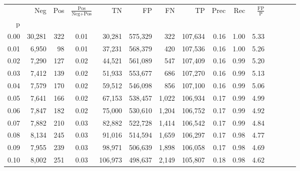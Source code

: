 \begin{tabular}{rrrcrrrrrrrrrrr}
\toprule
{} &     Neg &    Pos & $\frac{\text{Pos}}{\text{Neg}+\text{Pos}}$ &       TN &       FP &       FN &       TP &  Prec &   Rec & $\frac{\text{FP}}{\text{P}}$ \\
p    &         &        &                                            &          &          &          &          &       &       &                              \\
\midrule
0.00 &  30,281 &    322 &                                       0.01 &   30,281 &  575,329 &      322 &  107,634 &  0.16 &  1.00 &                         5.33 \\
0.01 &   6,950 &     98 &                                       0.01 &   37,231 &  568,379 &      420 &  107,536 &  0.16 &  1.00 &                         5.26 \\
0.02 &   7,290 &    127 &                                       0.02 &   44,521 &  561,089 &      547 &  107,409 &  0.16 &  0.99 &                         5.20 \\
0.03 &   7,412 &    139 &                                       0.02 &   51,933 &  553,677 &      686 &  107,270 &  0.16 &  0.99 &                         5.13 \\
0.04 &   7,579 &    170 &                                       0.02 &   59,512 &  546,098 &      856 &  107,100 &  0.16 &  0.99 &                         5.06 \\
0.05 &   7,641 &    166 &                                       0.02 &   67,153 &  538,457 &    1,022 &  106,934 &  0.17 &  0.99 &                         4.99 \\
0.06 &   7,847 &    182 &                                       0.02 &   75,000 &  530,610 &    1,204 &  106,752 &  0.17 &  0.99 &                         4.92 \\
0.07 &   7,882 &    210 &                                       0.03 &   82,882 &  522,728 &    1,414 &  106,542 &  0.17 &  0.99 &                         4.84 \\
0.08 &   8,134 &    245 &                                       0.03 &   91,016 &  514,594 &    1,659 &  106,297 &  0.17 &  0.98 &                         4.77 \\
0.09 &   7,955 &    239 &                                       0.03 &   98,971 &  506,639 &    1,898 &  106,058 &  0.17 &  0.98 &                         4.69 \\
0.10 &   8,002 &    251 &                                       0.03 &  106,973 &  498,637 &    2,149 &  105,807 &  0.18 &  0.98 &                         4.62 \\

\end{tabular}
